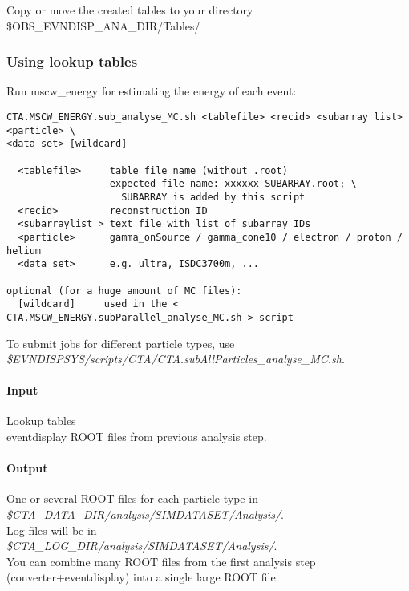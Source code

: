 \documentclass[titlepage,a4paper,twoside,11pt]{report}
\begin{document}
Copy or move the created tables to your directory 
\$OBS\_EVNDISP\_ANA\_DIR/Tables/

\subsubsection{Using lookup tables}

Run mscw\_energy for estimating the energy of each
event: 

\begin{lstlisting}
CTA.MSCW_ENERGY.sub_analyse_MC.sh <tablefile> <recid> <subarray list> <particle> \
<data set> [wildcard]

  <tablefile>     table file name (without .root)
                  expected file name: xxxxxx-SUBARRAY.root; \
                    SUBARRAY is added by this script
  <recid>         reconstruction ID
  <subarraylist > text file with list of subarray IDs
  <particle>      gamma_onSource / gamma_cone10 / electron / proton / helium
  <data set>      e.g. ultra, ISDC3700m, ...

optional (for a huge amount of MC files):
  [wildcard]     used in the < CTA.MSCW_ENERGY.subParallel_analyse_MC.sh > script
\end{lstlisting}

To submit jobs for different particle types, use \\
{\it \$EVNDISPSYS/scripts/CTA/CTA.subAllParticles\_analyse\_MC.sh}.

\paragraph{Input}
Lookup tables \\
eventdisplay ROOT files from previous analysis step.

\paragraph{Output}

One or several ROOT files for each particle type in \\
{\it \$CTA\_DATA\_DIR/analysis/SIMDATASET/Analysis/}. \\
Log files will be in \\
{\it \$CTA\_LOG\_DIR/analysis/SIMDATASET/Analysis/}. \\
You can combine many ROOT files from the first analysis step (converter+eventdisplay) into a single large ROOT file.

\end{document}
